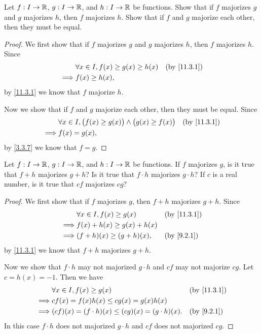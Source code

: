 \exercisesection

\begin{ex}\label{ex:11.3.1}
  Let \(f : I \to \mathbb{R}\), \(g : I \to \mathbb{R}\), and \(h : I \to \mathbb{R}\) be functions.
  Show that if \(f\) majorizes \(g\) and \(g\) majorizes \(h\), then \(f\) majorizes \(h\).
  Show that if \(f\) and \(g\) majorize each other, then they must be equal.
\end{ex}

\begin{proof}
  We first show that if \(f\) majorizes \(g\) and \(g\) majorizes \(h\), then \(f\) majorizes \(h\).
  Since
  \begin{align*}
             & \forall x \in I, f(x) \geq g(x) \geq h(x) &  & \by{11.3.1} \\
    \implies & f(x) \geq h(x),
  \end{align*}
  by \cref{11.3.1} we know that \(f\) majorize \(h\).

  Now we show that if \(f\) and \(g\) majorize each other, then they must be equal.
  Since
  \begin{align*}
             & \forall x \in I, \big(f(x) \geq g(x)\big) \land \big(g(x) \geq f(x)\big) &  & \by{11.3.1} \\
    \implies & f(x) = g(x),
  \end{align*}
  by \cref{3.3.7} we know that \(f = g\).
\end{proof}

\begin{ex}\label{ex:11.3.2}
  Let \(f : I \to \mathbb{R}\), \(g : I \to \mathbb{R}\), and \(h : I \to \mathbb{R}\) be functions.
  If \(f\) majorizes \(g\), is it true that \(f + h\) majorizes \(g + h\)?
  Is it true that \(f \cdot h\) majorizes \(g \cdot h\)?
  If \(c\) is a real number, is it true that \(cf\) majorizes \(cg\)?
\end{ex}

\begin{proof}
  We first show that if \(f\) majorizes \(g\), then \(f + h\) majorizes \(g + h\).
  Since
  \begin{align*}
             & \forall x \in I, f(x) \geq g(x) &  & \by{11.3.1} \\
    \implies & f(x) + h(x) \geq g(x) + h(x)                     \\
    \implies & (f + h)(x) \geq (g + h)(x),     &  & \by{9.2.1}
  \end{align*}
  by \cref{11.3.1} we know that \(f + h\) majorizes \(g + h\).

  Now we show that \(f \cdot h\) may not majorized \(g \cdot h\) and \(cf\) may not majorize \(cg\).
  Let \(c = h(x) = -1\).
  Then we have
  \begin{align*}
             & \forall x \in I, f(x) \geq g(x)                         &  & \by{11.3.1} \\
    \implies & cf(x) = f(x) h(x) \leq cg(x) = g(x) h(x)                                 \\
    \implies & (cf)(x) = (f \cdot h)(x) \leq (cg)(x) = (g \cdot h)(x). &  & \by{9.2.1}
  \end{align*}
  In this case \(f \cdot h\) does not majorized \(g \cdot h\) and \(cf\) does not majorized \(cg\).
\end{proof}

